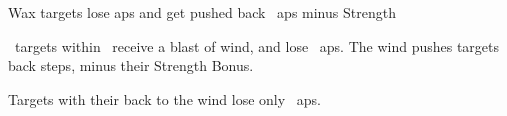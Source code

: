 
  {\mAir}%
  {Wax}%
  {\duplicated}%
  {}%
  {targets lose  \glspl{ap} and get pushed back ~\glspl{ap} minus Strength}%
  {
    \spellArea\ targets within \spellRange\ receive a blast of wind, and lose ~\glspl{ap}.
    The wind pushes targets back  steps, minus their Strength Bonus.

  Targets with their back to the wind lose only
  \setcounter{track}{\value{spelllevel}}%
  ~\glspl{ap}.
  }
